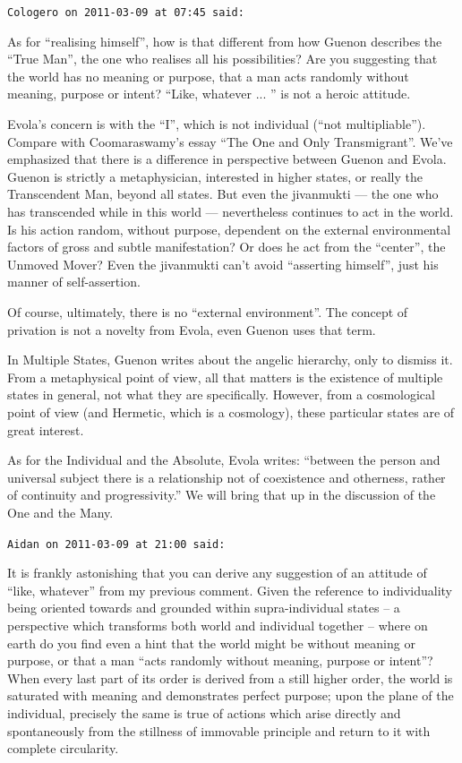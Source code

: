 \begin{footnotesize}
\begin{sffamily}
\hfill

\texttt{Cologero on 2011-03-09 at 07:45 said:}

As for ``realising himself'', how is that different from how Guenon describes the ``True Man'', the one who realises all his possibilities? Are you suggesting that the world has no meaning or purpose, that a man acts randomly without meaning, purpose or intent? ``Like, whatever
... '' is not a heroic attitude.


Evola's concern is with the ``I'', which is not individual (``not multipliable''). Compare with Coomaraswamy's essay ``The One and Only Transmigrant''. We've emphasized that there is a difference in perspective between Guenon and Evola. Guenon is strictly a metaphysician, interested in higher states, or really the Transcendent Man, beyond all states. But even the jivanmukti --- the one who has transcended while in this world --- nevertheless continues to act in the world. Is his action random, without purpose, dependent on the external environmental factors of gross and subtle manifestation? Or does he act from the ``center'', the Unmoved Mover? Even the jivanmukti can't avoid ``asserting himself'', just his manner of self-assertion.

Of course, ultimately, there is no ``external environment''. The concept of privation is not a novelty from Evola, even Guenon uses that term.

In Multiple States, Guenon writes about the angelic hierarchy, only to dismiss it. From a metaphysical point of view, all that matters is the existence of multiple states in general, not what they are specifically. However, from a cosmological point of view (and Hermetic, which is a cosmology), these particular states are of great interest.

As for the Individual and the Absolute, Evola writes: ``between the person and universal subject there is a relationship not of coexistence and otherness, rather of continuity and progressivity.'' We will bring that up in the discussion of the One and the Many.

\hfill

\texttt{Aidan on 2011-03-09 at 21:00 said:}

It is frankly astonishing that you can derive any suggestion of an attitude of ``like, whatever'' from my previous comment. Given the reference to individuality being oriented towards and grounded within supra-individual states -- a perspective which transforms both world and individual together -- where on earth do you find even a hint that the world might be without meaning or purpose, or that a man ``acts randomly without meaning, purpose or intent''? When every last part of its order is derived from a still higher order, the world is saturated with meaning and demonstrates perfect purpose; upon the plane of the individual, precisely the same is true of actions which arise directly and spontaneously from the stillness of immovable principle and return to it with complete circularity.


\end{sffamily}
\end{footnotesize}
